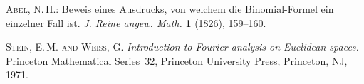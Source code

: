 \documentclass[a4paper,11pt,spanish, twoside, leqno]{tfg-uam}
\theoremstyle{definition}
\begin{document}
\begin{thebibliography}{10}


    \textsc{Abel, N.\,H.}: 
    Beweis eines Ausdrucks, von welchem die Binomial-Formel ein einzelner Fall ist. 
    \textit{J. Reine angew. Math.} {\bf1} (1826), 159--160.

    \textsc{Stein, E.\,M. and Weiss, G.}
    \textit{Introduction to  Fourier analysis on Euclidean spaces.}
    Princeton Mathematical Series~32, Princeton University Press, Princeton, NJ, 1971.
    
    
\end{thebibliography}
\cleardoublepage
\end{document}
